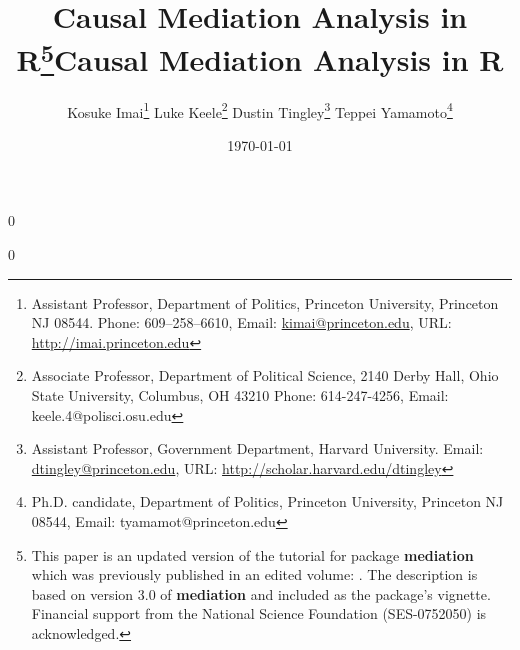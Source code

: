 \documentclass[11pt,letterpaper]{article}
\theoremstyle{plain}
\begin{document}
\newcommand\spacingset[1]{\renewcommand{\baselinestretch}%
{#1}\small\normalsize}

\spacingset{1.2}

\newcommand{\blind}{0}
\newcommand{\polisci}{1}

\newcommand{\tit}{Causal Mediation Analysis in R}




\blind

{\title{\bf \tit\thanks{This paper is an updated version of the tutorial
    for package {\bf mediation} which was previously published in an edited
    volume: \citet{imai:etal:10}.
    The description is based on version 3.0 of {\bf mediation} and included as
    the package's vignette.
    Financial support from the National Science Foundation
    (SES-0752050) is acknowledged.}}

  \author{Kosuke Imai\thanks{Assistant Professor, Department of
      Politics, Princeton University, Princeton NJ 08544. Phone:
      609--258--6610, Email:
      \href{mailto:kimai@princeton.edu}{kimai@princeton.edu}, URL:
      \href{http://imai.princeton.edu}{http://imai.princeton.edu}}
    \quad \quad Luke Keele\thanks{Associate Professor, Department of
      Political Science, 2140 Derby Hall, Ohio State University,
      Columbus, OH 43210 Phone: 614-247-4256, Email:
      keele.4@polisci.osu.edu}
    \quad \quad Dustin Tingley\thanks{Assistant Professor, Government Department, Harvard University. Email:
      \href{dtingley@gov.harvard.edu}{dtingley@princeton.edu}, URL:
      \href{http://scholar.harvard.edu/dtingley}{http://scholar.harvard.edu/dtingley}}
    \quad \quad Teppei Yamamoto\thanks{Ph.D. candidate, Department of
      Politics, Princeton University, Princeton NJ 08544, Email: tyamamot@princeton.edu}
}

\date{ \today
}

\maketitle
}\fi

\blind \title{\bf \tit} %
\fi

\end{document}
